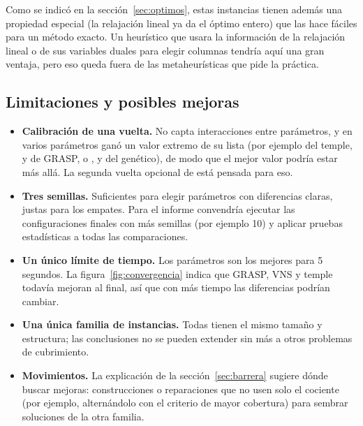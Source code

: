 Como se indicó en la sección~\ref{sec:optimos}, estas instancias tienen además una propiedad
especial (la relajación lineal ya da el óptimo entero) que las hace fáciles para un método
exacto. Un heurístico que usara la información de la relajación lineal o de sus variables
duales para elegir columnas tendría aquí una gran ventaja, pero eso queda fuera de las
metaheurísticas que pide la práctica.

\subsection{Limitaciones y posibles mejoras}

\begin{itemize}
  \item \textbf{Calibración de una vuelta.} No capta interacciones entre parámetros, y en
        varios parámetros ganó un valor extremo de su lista (por ejemplo  del
        temple,  y  de GRASP, o ,  y  del
        genético), de modo que el mejor valor podría estar más allá. La segunda vuelta
        opcional de  está pensada para eso.
  \item \textbf{Tres semillas.} Suficientes para elegir parámetros con diferencias claras,
        justas para los empates. Para el informe convendría ejecutar las configuraciones
        finales con más semillas (por ejemplo 10) y aplicar pruebas estadísticas a todas las
        comparaciones.
  \item \textbf{Un único límite de tiempo.} Los parámetros son los mejores para 5 segundos.
        La figura~\ref{fig:convergencia} indica que GRASP, VNS y temple todavía mejoran al
        final, así que con más tiempo las diferencias podrían cambiar.
  \item \textbf{Una única familia de instancias.} Todas tienen el mismo tamaño y estructura;
        las conclusiones no se pueden extender sin más a otros problemas de cubrimiento.
  \item \textbf{Movimientos.} La explicación de la sección~\ref{sec:barrera} sugiere dónde
        buscar mejoras: construcciones o reparaciones que no usen solo el cociente (por
        ejemplo, alternándolo con el criterio de mayor cobertura) para sembrar soluciones de
        la otra familia.
\end{itemize}
